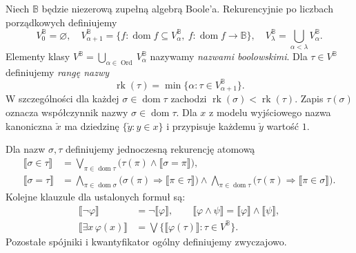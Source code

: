 \begin{definicja}
\label{def:boolean35-names}
Niech $\mathbb B$ będzie niezerową
zupełną algebrą Boole'a.
Rekurencyjnie po liczbach porządkowych
definiujemy
\[
 V_0^{\mathbb B}=\varnothing,\quad
 V_{\alpha+1}^{\mathbb B}
 =\{f:\operatorname{dom}f\subseteq
   V_\alpha^{\mathbb B},\
   f:\operatorname{dom}f\to\mathbb B\},
 \quad
 V_\lambda^{\mathbb B}
 =\bigcup_{\alpha<\lambda}V_\alpha^{\mathbb B}.
\]
Elementy klasy
$V^{\mathbb B}=\bigcup_{\alpha\in\operatorname{Ord}}
V_\alpha^{\mathbb B}$ nazywamy
\emph{nazwami boolowskimi}.
Dla $\tau\in V^{\mathbb B}$
definiujemy \emph{rangę nazwy}
\[
 \operatorname{rk}(\tau)=
 \min\{\alpha:\tau\in V_{\alpha+1}^{\mathbb B}\}.
\]
W szczególności dla każdej
$\sigma\in\operatorname{dom}\tau$
zachodzi
$\operatorname{rk}(\sigma)<
 \operatorname{rk}(\tau)$.
Zapis $\tau(\sigma)$ oznacza
współczynnik nazwy
$\sigma\in\operatorname{dom}\tau$.
Dla $x$ z modelu wyjściowego
nazwa kanoniczna $\check x$ ma dziedzinę
$\{\check y:y\in x\}$ i przypisuje każdemu
$\check y$ wartość $1$.
\end{definicja}

\begin{definicja}
\label{def:boolean35-values}
Dla nazw $\sigma,\tau$ definiujemy
jednoczesną rekurencję atomową
\[
\begin{aligned}
\llbracket\sigma\in\tau\rrbracket
 &=\bigvee_{\pi\in\operatorname{dom}\tau}
       \bigl(\tau(\pi)\wedge
             \llbracket\sigma=\pi\rrbracket\bigr),\\
\llbracket\sigma=\tau\rrbracket
 &=\bigwedge_{\pi\in\operatorname{dom}\sigma}
       \bigl(\sigma(\pi)\Rightarrow
             \llbracket\pi\in\tau\rrbracket\bigr)
   \wedge
   \bigwedge_{\pi\in\operatorname{dom}\tau}
       \bigl(\tau(\pi)\Rightarrow
             \llbracket\pi\in\sigma\rrbracket\bigr).
\end{aligned}
\]
Kolejne klauzule dla ustalonych formuł są:
\[
\begin{aligned}
\llbracket\neg\varphi\rrbracket
   &=\neg\llbracket\varphi\rrbracket,\qquad
\llbracket\varphi\land\psi\rrbracket
   =\llbracket\varphi\rrbracket
       \wedge\llbracket\psi\rrbracket,\\
\llbracket\exists x\,\varphi(x)\rrbracket
   &=\bigvee\{\llbracket\varphi(\tau)\rrbracket:
               \tau\in V^{\mathbb B}\}.
\end{aligned}
\]
Pozostałe spójniki i kwantyfikator
ogólny definiujemy zwyczajowo.
\end{definicja}

